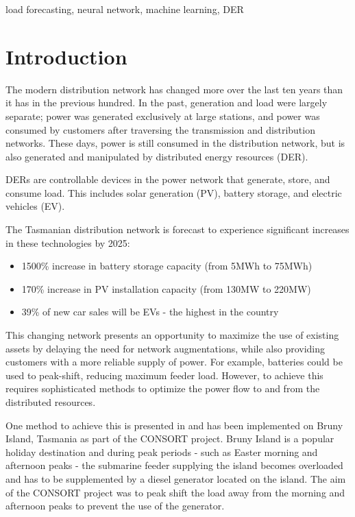 \documentclass[conference]{IEEEtran}
\begin{document}
\begin{IEEEkeywords}
load forecasting, neural network, machine learning, DER
\end{IEEEkeywords}

\section{Introduction}
The modern distribution network has changed more over the last ten years than it has in the previous hundred.
In the past, generation and load were largely separate; power was generated exclusively at large stations, and power was consumed by customers after traversing the transmission and distribution networks. 
These days, power is still consumed in the distribution network, but is also generated and manipulated by distributed energy resources (DER). 
\par
DERs are controllable devices in the power network that generate, store, and consume load. 
This includes solar generation (PV), battery storage, and electric vehicles (EV). 
\par
The Tasmanian distribution network is forecast to experience significant increases in these technologies by 2025: \\
\begin{itemize}
	\item 1500\% increase in battery storage capacity (from 5MWh to 75MWh) \cite{Jacobs2017}
	\item 170\% increase in PV installation capacity (from 130MW to 220MW) \cite{Jacobs2017}
	\item 39\% of new car sales will be EVs - the highest in the country \cite{AEMO2016}
\end{itemize}

This changing network presents an opportunity to maximize the use of existing assets by delaying the need for network augmentations, while also providing customers with a more reliable supply of power.
For example, batteries could be used to peak-shift, reducing maximum feeder load.
However, to achieve this requires sophisticated methods to optimize the power flow to and from the distributed resources.
\par
One method to achieve this is presented in \cite{Scott2014} and has been implemented on Bruny Island, Tasmania as part of the CONSORT project.
Bruny Island is a popular holiday destination and during peak periods - such as Easter morning and afternoon peaks - the submarine feeder supplying the island becomes overloaded and has to be supplemented by a diesel generator located on the island.
The aim of the CONSORT project was to peak shift the load away from the morning and afternoon peaks to prevent the use of the generator.
\end{document}
